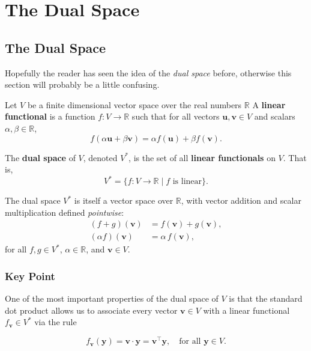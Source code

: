 \chapter{The Dual Space}

\Large

\section{The Dual Space}

Hopefully the reader has seen the idea of the \emph{dual space} before, otherwise this section will probably be a little confusing. 

Let $ V $ be a finite dimensional vector space over the real numbers $ \mathbb{R} $  
A \textbf{linear functional} is a function $ f: V \to \mathbb{R} $ such that for all vectors $ \mathbf{u}, \mathbf{v} \in V $ and scalars $ \alpha, \beta \in \mathbb{R} $,
\[
f(\alpha \mathbf{u} + \beta \mathbf{v}) = \alpha f(\mathbf{u}) + \beta f(\mathbf{v}).
\]



The \textbf{dual space} of $ V $, denoted $ V^* $, is the set of all \textbf{linear functionals} on $ V $. That is,
\[
V^* = \{ f: V \to \mathbb{R} \mid f \text{ is linear} \}.
\]



The dual space $ V^* $ is itself a vector space over $ \mathbb{R} $, with vector addition and scalar multiplication defined \textit{pointwise}:
\begin{align*}
(f + g)(\mathbf{v}) &= f(\mathbf{v}) + g(\mathbf{v}), \\
(\alpha f)(\mathbf{v}) &= \alpha \, f(\mathbf{v}),
\end{align*}
for all $ f, g \in V^* $, $ \alpha \in \mathbb{R} $, and $ \mathbf{v} \in V $.



\subsection*{\Large Key Point}

One of the most important properties of the dual space of $V$ is that the standard dot product allows us to associate every vector $\mathbf{v} \in V$ with a linear functional $f_{\mathbf{v}} \in V^*$ via the rule

\vspace{1em}
\[
\boxed{f_{\mathbf{v}}(\mathbf{y}) = \mathbf{v} \cdot \mathbf{y} = \mathbf{v}^\top \mathbf{y}, 
\quad \text{for all } \mathbf{y} \in V}.
\]
\vspace{1em}

